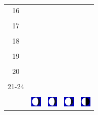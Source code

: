 \documentclass[a4paper,12pt, tikz]{scrartcl}
\begin{document}
\begin{tabularx}{\linewidth}{|c|X|X|p{2cm}|p{2cm}|}
            &   &       &    &   \\
          \hline
          16&   &                 &    &   \\
            &   &       &    &   \\
          \hline
          17&   &                 &    &   \\
            &   &       &    &   \\
          \hline
          18&   &                 &    &   \\
            &   &       &    &   \\
          \hline
          19&   &                 &     &   \\
            &   &       &    &   \\
          \hline
          20&   &              &    &   \\
            &   &       &    &   \\
          \hline 
          21-24&   &              &    &   \\
            &   &       &    &   \\
          \hline
                      & \vspace{0.01cm} \centerline{\includegraphics[width=0.5cm]{moon_phases/Moon_phase_5.svg.png}} \vspace{0.1cm} & \vspace{0.01cm} \centerline{\includegraphics[width=0.5cm]{moon_phases/Moon_phase_5.svg.png}} \vspace{0.1cm} & \vspace{0.01cm} \centerline{\includegraphics[width=0.5cm]{moon_phases/Moon_phase_5.svg.png}} \vspace{0.1cm} & \vspace{0.01cm} \centerline{\includegraphics[width=0.5cm]{moon_phases/Moon_phase_6.svg.png}} \vspace{0.1cm}\\
          \hline    
        \end{tabularx}
\end{document}
